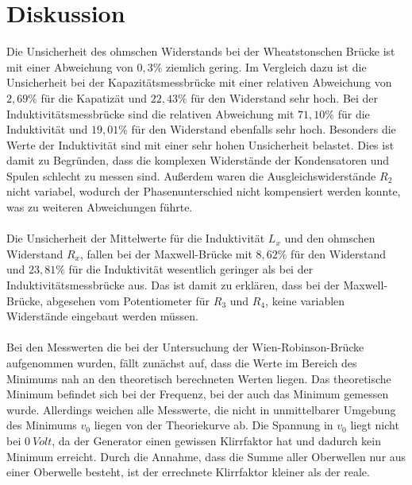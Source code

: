 \section{Diskussion}
\label{sec:Diskussion}
Die Unsicherheit des ohmschen Widerstands bei der Wheatstonschen Brücke ist mit einer Abweichung von $0,3\%$ ziemlich gering.
Im Vergleich dazu ist die Unsicherheit bei der Kapazitätsmessbrücke mit einer relativen Abweichung von $2,69\%$ für die Kapatizät und $22,43\%$ für den Widerstand sehr hoch.
Bei der Induktivitätsmessbrücke sind die relativen Abweichung mit $71,10\%$ für die Induktivität und $19,01\%$ für den Widerstand ebenfalls sehr hoch.
Besonders die Werte der Induktivität sind mit einer sehr hohen Unsicherheit belastet.
Dies ist damit zu Begründen, dass die komplexen Widerstände der Kondensatoren und Spulen schlecht zu messen sind.
Außerdem waren die Ausgleichswiderstände $R_2$ nicht variabel, wodurch der Phasenunterschied nicht kompensiert werden konnte, was zu weiteren Abweichungen führte.
\\\\
Die Unsicherheit der Mittelwerte für die Induktivität $L_x$ und den ohmschen Widerstand $R_x$, fallen bei der Maxwell-Brücke mit $8,62\%$ für den Widerstand und $23,81\%$ für die Induktivität wesentlich geringer als bei der Induktivitätsmessbrücke aus.
Das ist damit zu erklären, dass bei der Maxwell-Brücke, abgesehen vom Potentiometer für $R_3$ und $R_4$, keine variablen Widerstände eingebaut werden müssen.
\\\\
Bei den Messwerten die bei der Untersuchung der Wien-Robinson-Brücke aufgenommen wurden, fällt zunächst auf, dass die Werte im Bereich des Minimums nah an den theoretisch berechneten Werten liegen.
Das theoretische Minimum befindet sich bei der Frequenz, bei der auch das Minimum gemessen wurde.
Allerdings weichen alle Messwerte, die nicht in unmittelbarer Umgebung des Minimums $v_0$ liegen von der Theoriekurve ab.
Die Spannung in $v_0$ liegt nicht bei $\SI{0}{Volt}$, da der Generator einen gewissen Klirrfaktor hat und dadurch kein Minimum erreicht.
Durch die Annahme, dass die Summe aller Oberwellen nur aus einer Oberwelle besteht, ist der errechnete Klirrfaktor kleiner als der reale.